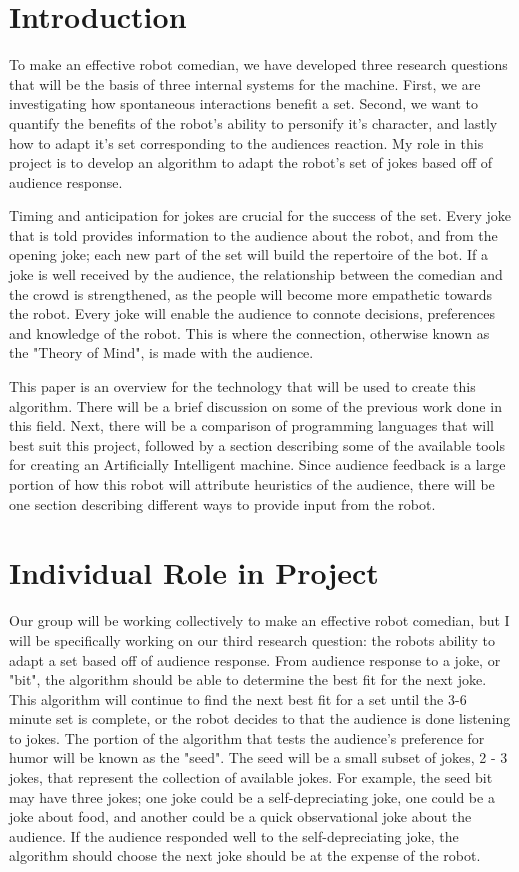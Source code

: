 \documentclass[onecolumn, draftclsnofoot,10pt, compsoc]{IEEEtran}
\begin{document}
\section{Introduction}

  To make an effective robot comedian, we have developed three research questions that will be the basis of three internal systems for the machine. First, we are investigating how spontaneous interactions benefit a set. Second, we want to quantify the benefits of the robot's ability to personify it's character, and lastly how to adapt it's set corresponding to the audiences reaction. My role in this project is to develop an algorithm to adapt the robot's set of jokes based off of audience response.

  Timing and anticipation for jokes are crucial for the success of the set. Every joke that is told provides information to the audience about the robot, and from the opening joke; each new part of the set will build the repertoire of the bot. If a joke is well received by the audience, the relationship between the comedian and the crowd is strengthened, as the people will become more empathetic towards the robot. Every joke will enable the audience to connote decisions, preferences and knowledge of the robot. This is where the connection, otherwise known as the "Theory of Mind", is made with the audience\cite{leslie}.

  This paper is an overview for the technology that will be used to create this algorithm. There will be a brief discussion on some of the previous work done in this field. Next, there will be a comparison of programming languages that will best suit this project, followed by a section describing some of the available tools for creating an Artificially Intelligent machine. Since audience feedback is a large portion of how this robot will attribute heuristics of the audience, there will be one section describing different ways to provide input from the robot.

\section{Individual Role in Project}

Our group will be working collectively to make an effective robot comedian, but I will be specifically working on our third research question: the robots ability to adapt a set based off of audience response. From audience response to a joke, or "bit", the algorithm should be able to determine the best fit for the next joke. This algorithm will continue to find the next best fit for a set until the 3-6 minute set is complete, or the robot decides to that the audience is done listening to jokes. The portion of the algorithm that tests the audience's preference for humor will be known as the "seed". The seed will be a small subset of jokes, 2 - 3 jokes, that represent the collection of available jokes. For example, the seed bit may have three jokes; one joke could be a self-depreciating joke, one could be a joke about food, and another could be a quick observational joke about the audience. If the audience responded well to the self-depreciating joke, the algorithm should choose the next joke should be at the expense of the robot. 
\end{document}

